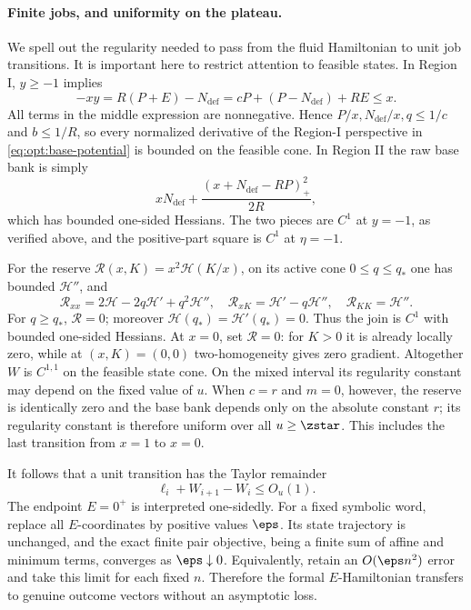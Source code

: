 \paragraph{Finite jobs, and uniformity on the plateau.}
We spell out the regularity needed to pass from the fluid Hamiltonian to
unit job transitions.  It is important here to restrict attention to
feasible states.  In Region I, $y\ge-1$ implies
\begin{equation}
 -xy=R(P+E)-N_{\mathrm{def}}=cP+(P-N_{\mathrm{def}})+RE\le x.
 \label{eq:opt:feasible-compactness}
\end{equation}
All terms in the middle expression are nonnegative.  Hence
$P/x,N_{\mathrm{def}}/x,q\le1/c$ and $b\le1/R$, so every normalized derivative of
the Region-I perspective in \eqref{eq:opt:base-potential} is bounded on
the feasible cone.  In Region II the raw base bank is simply
\begin{equation}
 xN_{\mathrm{def}}+\frac{(x+N_{\mathrm{def}}-RP)_+^2}{2R},
 \label{eq:opt:region-two-raw-bank}
\end{equation}
which has bounded one-sided Hessians.  The two pieces are $C^1$ at
$y=-1$, as verified above, and the positive-part square is $C^1$ at
$\eta=-1$.

For the reserve $\mathcal R(x,K)=x^2\mathcal H(K/x)$, on its active cone
$0\le q\le q_*$ one has bounded $\mathcal H''$, and
\begin{equation}
 \mathcal R_{xx}=2\mathcal H-2q\mathcal H'+q^2\mathcal H'',
 \quad
 \mathcal R_{xK}=\mathcal H'-q\mathcal H'',
 \quad
 \mathcal R_{KK}=\mathcal H''.
 \label{eq:opt:reserve-hessian}
\end{equation}
For $q\ge q_*$, $\mathcal R=0$; moreover
$\mathcal H(q_*)=\mathcal H'(q_*)=0$.  Thus the join is $C^1$ with
bounded one-sided Hessians.  At $x=0$, set $\mathcal R=0$: for $K>0$ it is
already locally zero, while at $(x,K)=(0,0)$ two-homogeneity gives zero
gradient.  Altogether $W$ is $C^{1,1}$ on the feasible state cone.  On the
mixed interval its regularity constant may depend on the fixed value of $u$.
When $c=r$ and $m=0$, however, the reserve is identically zero and the base
bank depends only on the absolute constant $r$; its regularity constant is
therefore uniform over all $u\ge \zstar$.  This includes the last transition
from $x=1$ to $x=0$.

It follows that a unit transition has the Taylor remainder
\begin{equation}
 \ell_i+W_{i+1}-W_i\le O_u(1).
 \label{eq:opt:finite-taylor}
\end{equation}
The endpoint $E=0^+$ is interpreted one-sidedly.  For a fixed symbolic
word, replace all $E$-coordinates by positive values $\eps$.  Its
state trajectory is unchanged, and the exact finite pair objective, being
a finite sum of affine and minimum terms, converges as
$\eps\downarrow0$.  Equivalently, retain an
$O(\eps n^2)$ error and take this limit for each fixed $n$.
Therefore the formal $E$-Hamiltonian transfers to genuine outcome
vectors without an asymptotic loss.

